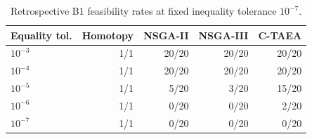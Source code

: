 \begin{table}[htbp]
\centering
\small
\caption{Retrospective B1 feasibility rates at fixed inequality tolerance $10^{-7}$.}
\label{tab:example2_b1}
\begin{tabular}{lrrrr}
\hline
Equality tol. & Homotopy & NSGA-II & NSGA-III & C-TAEA \\
\hline
$10^{-3}$ & 1/1 & 20/20 & 20/20 & 20/20 \\
$10^{-4}$ & 1/1 & 20/20 & 20/20 & 20/20 \\
$10^{-5}$ & 1/1 & 5/20 & 3/20 & 15/20 \\
$10^{-6}$ & 1/1 & 0/20 & 0/20 & 2/20 \\
$10^{-7}$ & 1/1 & 0/20 & 0/20 & 0/20 \\
\hline
\end{tabular}
\end{table}
